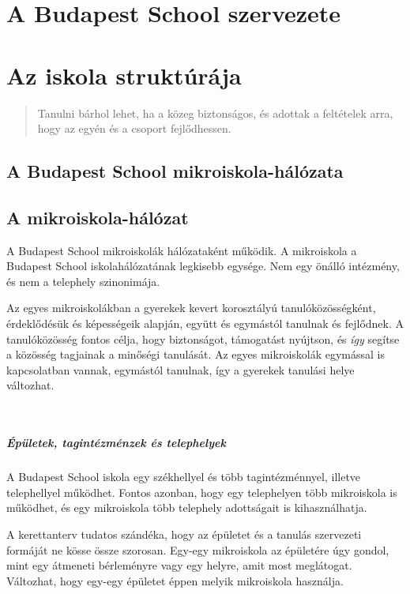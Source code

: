 \ifkerettanterv
\chapter{A Budapest School szervezete}
\else
\chapter{Az iskola struktúrája}

\fi

\begin{quote}
Tanulni bárhol lehet, ha a közeg biztonságos, és adottak a feltételek arra, hogy az egyén és a csoport fejlődhessen.
\end{quote}
\ifkerettanterv
\section{A Budapest School mikroiskola-hálózata}
\else
\section{A mikroiskola-hálózat}

\fi

 A Budapest School mikroiskolák hálózataként működik. A mikroiskola a Budapest School iskolahálózatának legkisebb egysége. Nem egy önálló intézmény, és nem a telephely szinonimája.

Az egyes mikroiskolákban a gyerekek kevert korosztályú tanulóközösségként,
érdeklődésük és képességeik alapján, együtt és egymástól tanulnak és fejlődnek.
A tanulóközösség fontos célja, hogy biztonságot, támogatást nyújtson, és \emph{így} segítse a közösség tagjainak a minőségi tanulását. Az egyes mikroiskolák egymással is kapcsolatban vannak,
egymástól tanulnak, így a gyerekek tanulási helye változhat.

 \paragraph{Épületek, tagintézménzek és telephelyek}
A Budapest School iskola egy székhellyel és több tagintézménnyel, illetve telephellyel működhet. Fontos azonban, hogy egy telephelyen több mikroiskola is működhet, és egy mikroiskola több telephely adottságait is kihasználhatja.

A kerettanterv tudatos szándéka, hogy az épületet és a
tanulás szervezeti formáját ne kösse össze szorosan. Egy-egy mikroiskola az épületére úgy gondol, mint egy átmeneti bérleményre vagy egy helyre, amit most meglátogat.
Változhat, hogy egy-egy épületet éppen melyik mikroiskola használja.

